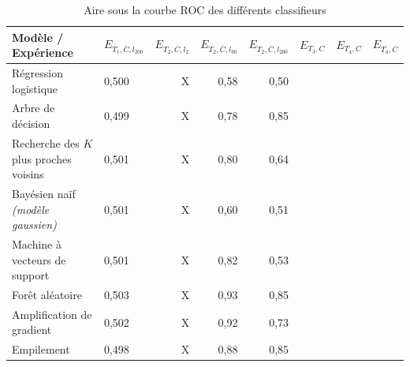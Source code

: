             \begin{table}[H]
                \centering
                \begin{tabular}{p{}|u|ddd|tt|q} \toprule
                    \textbf{Modèle / Expérience} &
                \textbf{$E_{T_1, \overline C, l_{200}}$} & \textbf{$E_{T_2, \overline C, l_2}$} &
                \textbf{$E_{T_2,\overline C, l_{30}}$} & \textbf{$E_{T_2,\overline C, l_{200}}$} & \textbf{
                    $E_{T_3, C}$}  & \textbf{$E_{T_4, C}$} & \textbf{
                    $E_{T_4,\overline C}$} \\
                    \midrule
                    Régression logistique & 0,500 & X & 0,58 & 0,50 &  &  & \\
                    Arbre de décision & 0,499 & X & 0,78 & 0,85 &  &  & \\
                    Recherche des $K$ plus proches voisins & 0,501 & X & 0,80 & 0,64 &  &  & \\
                    Bayésien naïf \textit{(modèle gaussien)} & 0,501 & X & 0,60 & 0,51 &  &  & \\
                    Machine à vecteurs de support & 0,501 & X & 0,82 & 0,53 &  &  &  \\
                    Forêt aléatoire & 0,503 & X & 0,93 & 0,85 &  &  & \\
                    Amplification de gradient & 0,502 & X & 0,92 & 0,73 &  &  & \\
                    Empilement & 0,498 & X & 0,88 & 0,85 &  &  & \\
                    \bottomrule
                \end{tabular}
                \caption{Aire sous la courbe ROC des différents classifieurs}
                \label{tab2:}
            \end{table}

